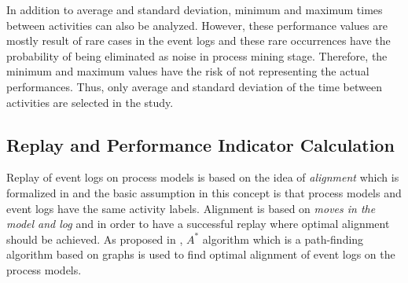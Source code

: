 In addition to average and standard deviation, minimum and maximum times between activities can also be analyzed. However, these performance values are mostly result of rare cases in the event logs and these rare occurrences have the probability of being eliminated as noise in process mining stage. Therefore, the minimum and maximum values have the risk of not representing the actual performances. Thus, only average and standard deviation of the time between activities are selected in the study. 

\subsection{Replay and Performance Indicator Calculation}
\label{subsec:replay-and-performance-summary}
Replay of event logs on process models is based on the idea of \textit{alignment} which is formalized in \cite{van2012replaying} and the basic assumption in this concept is that process models and event logs have the same activity labels. Alignment is based on \textit{moves in the model and log} and in order to have a successful replay where optimal alignment should be achieved. As proposed in \cite{adriansyah2011conformance, adriansyah2011towards}, $A^{*}$ algorithm which is a path-finding algorithm based on graphs is used to find optimal alignment of event logs on the process models.

